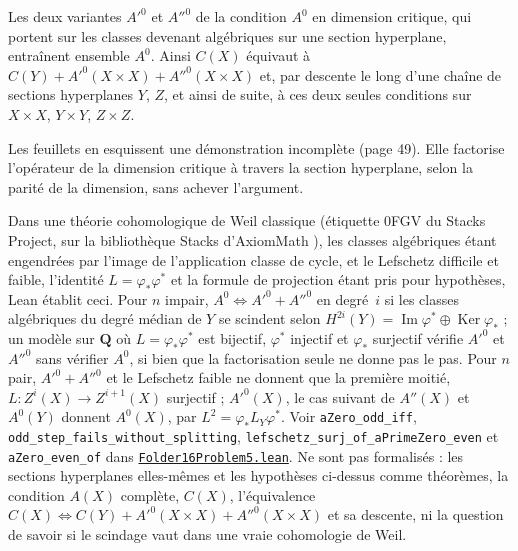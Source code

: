 \begin{encadre}
\begin{theoreme*}\nonverifie
Les deux variantes $A'^0$ et $A''^0$ de la condition $A^0$ en dimension critique, qui portent sur les classes devenant algébriques sur une section hyperplane, entraînent ensemble $A^0$. Ainsi $C(X)$ équivaut à $C(Y) + A'^0(X \times X) + A''^0(X \times X)$ et, par descente le long d'une chaîne de sections hyperplanes $Y$, $Z$, et ainsi de suite, à ces deux seules conditions sur $X \times X$, $Y \times Y$, $Z \times Z$.
\end{theoreme*}
\end{encadre}
{\small Les feuillets en esquissent une démonstration incomplète (page 49). Elle factorise l'opérateur de la dimension critique à travers la section hyperplane, selon la parité de la dimension, sans achever l'argument.\par}
{\small Dans une théorie cohomologique de Weil classique (étiquette 0FGV du Stacks Project, sur la bibliothèque Stacks d'AxiomMath \cite{axiomstacks}), les classes algébriques étant engendrées par l'image de l'application classe de cycle, et le Lefschetz difficile et faible, l'identité $L = \varphi_*\varphi^*$ et la formule de projection étant pris pour hypothèses, Lean établit ceci. Pour $n$ impair, $A^0 \Leftrightarrow A'^0 + A''^0$ en degré~$i$ si les classes algébriques du degré médian de $Y$ se scindent selon $H^{2i}(Y) = \operatorname{Im}\varphi^* \oplus \operatorname{Ker}\varphi_*$ ; un modèle sur $\mathbf Q$ où $L = \varphi_*\varphi^*$ est bijectif, $\varphi^*$ injectif et $\varphi_*$ surjectif vérifie $A'^0$ et $A''^0$ sans vérifier $A^0$, si bien que la factorisation seule ne donne pas le pas. Pour $n$ pair, $A'^0 + A''^0$ et le Lefschetz faible ne donnent que la première moitié, $L : Z^i(X) \to Z^{i+1}(X)$ surjectif ; $A'^0(X)$, le cas suivant de $A''(X)$ et $A^0(Y)$ donnent $A^0(X)$, par $L^2 = \varphi_* L_Y \varphi^*$. Voir \texttt{aZero\_odd\_iff}, \texttt{odd\_step\_fails\_without\_splitting}, \texttt{lefschetz\_surj\_of\_aPrimeZero\_even} et \texttt{aZero\_even\_of} dans \href{\leanblobmain/AlgebraicGeometry/Folder16Problem5.lean}{\texttt{Folder16Problem5.\allowbreak{}lean}}. Ne sont pas formalisés : les sections hyperplanes elles-mêmes et les hypothèses ci-dessus comme théorèmes, la condition $A(X)$ complète, $C(X)$, l'équivalence $C(X) \Leftrightarrow C(Y) + A'^0(X \times X) + A''^0(X \times X)$ et sa descente, ni la question de savoir si le scindage vaut dans une vraie cohomologie de Weil.\par}

